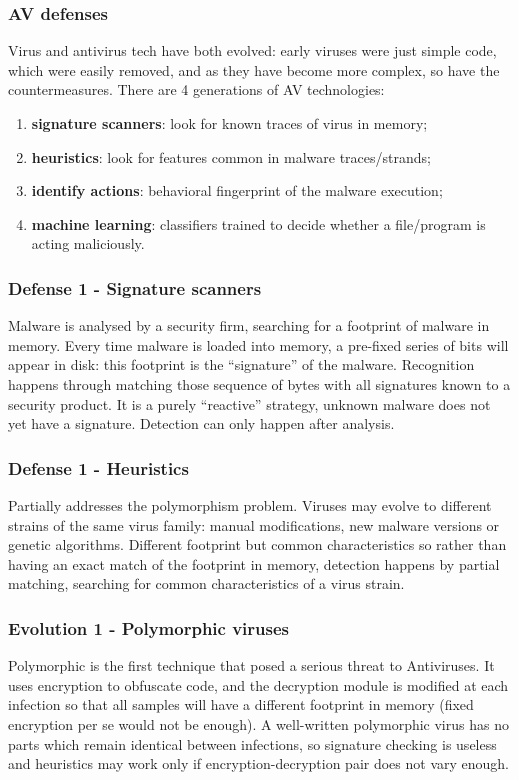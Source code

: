 \documentclass[a4paper, 10pt, titlepage]{article}
\begin{document}
\subsubsection*{AV defenses}
Virus and antivirus tech have both evolved: early viruses were just simple code, which were easily removed, and as they have become more complex, so have the countermeasures. There are 4 generations of AV technologies:
\begin{enumerate}
	\item \textbf{signature scanners}: look for known traces of virus in memory;
	\item \textbf{heuristics}: look for features common in malware 	traces/strands;
	\item \textbf{identify actions}: behavioral fingerprint of the malware execution;
	\item \textbf{machine learning}: classifiers trained to decide whether a file/program is acting maliciously.
\end{enumerate}

\subsubsection*{Defense 1 - Signature scanners}
Malware is analysed by a security firm, searching for a footprint of malware in memory. Every time malware is loaded into memory, a pre-fixed series of bits will appear in disk: this footprint is the “signature” of the malware. Recognition happens through matching those sequence of bytes with all signatures known to a security product. It is a purely “reactive” strategy, unknown malware does not yet have a signature. Detection can only happen after analysis.

\subsubsection*{Defense 1 - Heuristics}
Partially addresses the polymorphism problem. Viruses may evolve to different strains of the same virus family: manual modifications, new malware versions or genetic algorithms.
Different footprint but common characteristics so rather than having an exact match of the footprint in memory, detection happens by partial matching, searching for common characteristics of a virus strain.

\subsubsection*{Evolution 1 - Polymorphic viruses}
Polymorphic is the first technique that posed a serious threat to Antiviruses. It uses encryption to obfuscate code, and the decryption module is modified at each infection so that all samples will have a different footprint in memory (fixed encryption per se would not be enough). 
A well-written polymorphic virus has no parts which remain identical between infections, so signature checking is useless and heuristics may work only if encryption-decryption pair does not vary enough.
\end{document}
